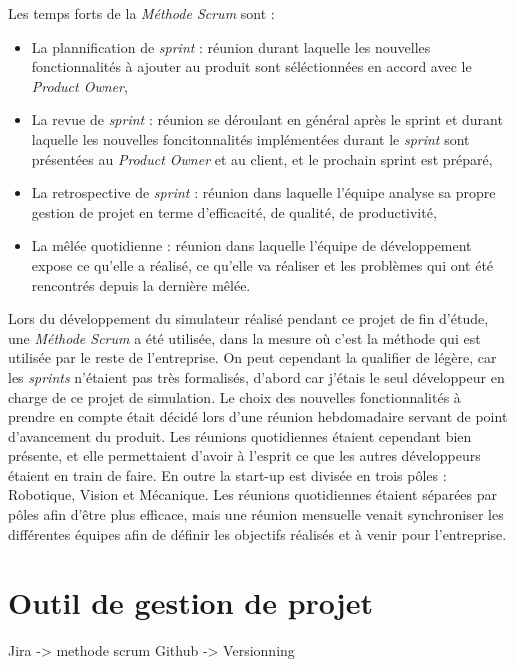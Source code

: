 		Les temps forts de la \textit{Méthode Scrum} sont :

		\begin{itemize}
			\item La plannification de \textit{sprint} : réunion durant laquelle les nouvelles fonctionnalités à ajouter au produit sont séléctionnées en accord avec le \textit{Product Owner},
			\item La revue de \textit{sprint} : réunion se déroulant en général après le sprint et durant laquelle les nouvelles foncitonnalités implémentées durant le \textit{sprint} sont présentées au \textit{Product Owner} et au client, et le prochain sprint est préparé,
			\item La retrospective de \textit{sprint} : réunion dans laquelle l'équipe analyse sa propre gestion de projet en terme d'efficacité, de qualité, de productivité,
			\item La mêlée quotidienne : réunion dans laquelle l'équipe de développement expose ce qu'elle a réalisé, ce qu'elle va réaliser et les problèmes qui ont été rencontrés depuis la dernière mêlée.
		\end{itemize}
	
		Lors du développement du simulateur réalisé pendant ce projet de fin d'étude, une \textit{Méthode Scrum} a été utilisée, dans la mesure où c'est la méthode qui est utilisée par le reste de l'entreprise. On peut cependant la qualifier de légère, car les \textit{sprints} n'étaient pas très formalisés, d'abord car j'étais le seul développeur en charge de ce projet de simulation. Le choix des nouvelles fonctionnalités à prendre en compte était décidé lors d'une réunion hebdomadaire servant de point d'avancement du produit. Les réunions quotidiennes étaient cependant bien présente, et elle permettaient d'avoir à l'esprit ce que les autres développeurs étaient en train de faire. En outre la start-up est divisée en trois pôles : Robotique, Vision et Mécanique. Les réunions quotidiennes étaient séparées par pôles afin d'être plus efficace, mais une réunion mensuelle venait synchroniser les différentes équipes afin de définir les objectifs réalisés et à venir pour l'entreprise.

	\section{Outil de gestion de projet}
		Jira -> methode scrum
		Github -> Versionning
	